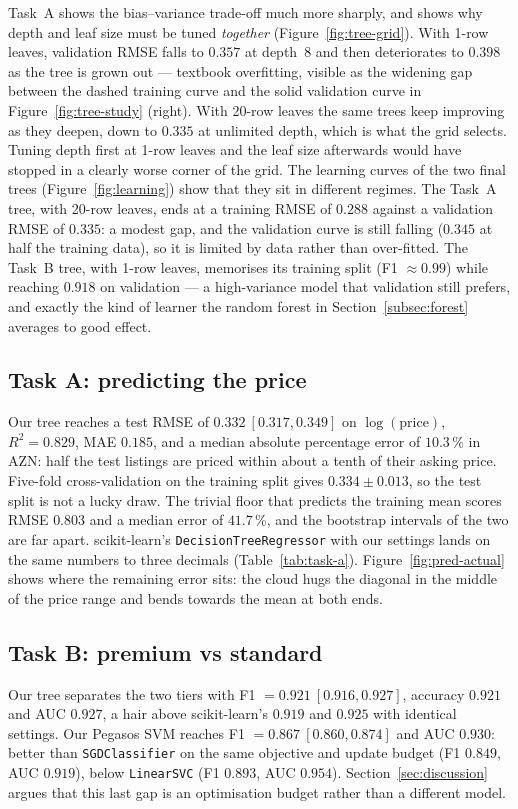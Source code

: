 \documentclass[10pt,twocolumn,a4paper]{article}
\begin{document}
Task~A shows the bias--variance trade-off much more sharply, and shows why
depth and leaf size must be tuned \emph{together} (Figure~\ref{fig:tree-grid}).
With 1-row leaves, validation RMSE falls to $0.357$ at depth~8 and then
deteriorates to $0.398$ as the tree is grown out --- textbook overfitting,
visible as the widening gap between the dashed training curve and the solid
validation curve in Figure~\ref{fig:tree-study} (right). With 20-row leaves
the same trees keep improving as they deepen, down to $0.335$ at unlimited
depth, which is what the grid selects. Tuning depth first at 1-row leaves and
the leaf size afterwards would have stopped in a clearly worse corner of the
grid. The learning curves of the two final trees (Figure~\ref{fig:learning}) show
that they sit in different regimes. The Task~A tree, with 20-row leaves, ends
at a training RMSE of $0.288$ against a validation RMSE of $0.335$: a modest
gap, and the validation curve is still falling ($0.345$ at half the training
data), so it is limited by data rather than over-fitted. The Task~B tree, with
1-row leaves, memorises its training split (F1 $\approx 0.99$) while reaching
$0.918$ on validation --- a high-variance model that validation still prefers,
and exactly the kind of learner the random forest in
Section~\ref{subsec:forest} averages to good effect.

\subsection{Task A: predicting the price}
Our tree reaches a test RMSE of $0.332\ [0.317, 0.349]$ on
$\log(\text{price})$, $R^2 = 0.829$, MAE $0.185$, and a median absolute
percentage error of $10.3\,\%$ in AZN: half the test listings are priced
within about a tenth of their asking price. Five-fold cross-validation on the
training split gives $0.334 \pm 0.013$, so the test split is not a lucky draw.
The trivial floor that predicts the training mean scores RMSE $0.803$ and a
median error of $41.7\,\%$, and the bootstrap intervals of the two are far
apart. scikit-learn's \texttt{DecisionTreeRegressor} with our settings lands on
the same numbers to three decimals (Table~\ref{tab:task-a}).
Figure~\ref{fig:pred-actual} shows where the remaining error sits: the cloud
hugs the diagonal in the middle of the price range and bends towards the mean
at both ends.

\subsection{Task B: premium vs standard}
Our tree separates the two tiers with F1 $=0.921\ [0.916, 0.927]$, accuracy
$0.921$ and AUC $0.927$, a hair above scikit-learn's $0.919$ and $0.925$ with
identical settings. Our Pegasos SVM reaches F1 $=0.867\ [0.860, 0.874]$ and
AUC $0.930$: better than \texttt{SGDClassifier} on the same objective and
update budget (F1 $0.849$, AUC $0.919$), below \texttt{LinearSVC}
(F1 $0.893$, AUC $0.954$). Section~\ref{sec:discussion} argues that this last
gap is an optimisation budget rather than a different model.
\end{document}

